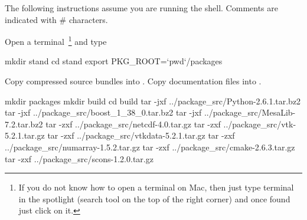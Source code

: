 The following instructions assume you are running the  shell.
Comments are indicated with \# characters. 

Open a terminal~\footnote{If you do not know how to open a terminal on Mac, then just type terminal in the spotlight (search tool on the top of the right corner) and once found just click on it.} and type

\begin{shellCode}
mkdir stand
cd stand
export PKG_ROOT=`pwd`/packages
\end{shellCode}

Copy compressed source bundles into .
Copy documentation files into .

\begin{shellCode}
mkdir packages
mkdir build
cd build
tar -jxf ../package_src/Python-2.6.1.tar.bz2
tar -jxf ../package_src/boost_1_38_0.tar.bz2
tar -jxf ../package_src/MesaLib-7.2.tar.bz2
tar -zxf ../package_src/netcdf-4.0.tar.gz
tar -zxf ../package_src/vtk-5.2.1.tar.gz
tar -zxf ../package_src/vtkdata-5.2.1.tar.gz
tar -zxf ../package_src/numarray-1.5.2.tar.gz
tar -zxf ../package_src/cmake-2.6.3.tar.gz
tar -zxf ../package_src/scons-1.2.0.tar.gz
\end{shellCode}

